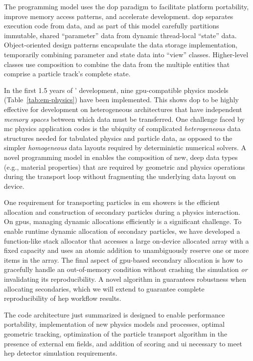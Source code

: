 The \celeritas programming model uses the \ac{dop} paradigm \cite{dop_2022} to
facilitate platform portability, improve memory access patterns, and accelerate
development. \ac{dop} separates execution code from data, and as part of this
model \celeritas carefully partitions immutable, shared ``parameter'' data from
dynamic thread-local ``state'' data. Object-oriented design patterns encapsulate
the data storage implementation, temporarily combining parameter and state data
into ``view'' classes.  Higher-level classes use composition to combine the data
from the multiple entities that comprise a particle track's complete state.

In the first 1.5 years of \celeritas' development, nine \ac{gpu}-compatible
physics models (Table~\ref{tab:em-physics}) have been implemented. This shows
\ac{dop} to be highly effective for development on heterogeneous architectures
that have independent \emph{memory spaces} between which data must be
transferred. One challenge faced by \ac{mc} physics application codes is the
ubiquity of complicated \emph{heterogeneous} data structures needed for
tabulated physics and particle data, as opposed to the simpler
\emph{homogeneous} data layouts required by deterministic numerical solvers. A
novel programming model in \celeritas enables the composition of new, deep data
types (e.g., material properties) that are required by geometric and physics
operations during the transport loop without fragmenting the underlying data
layout on device.

One requirement for transporting particles in \ac{em} showers is the efficient
allocation and construction of secondary particles during a physics interaction.
On \acp{gpu}, managing dynamic allocations efficiently is a significant
challenge.  To enable runtime dynamic allocation of secondary particles, we have
developed a function-like stack allocator that accesses a large on-device
allocated array with a fixed capacity and uses an atomic addition to
unambiguously reserve one or more items in the array. The final aspect of
\ac{gpu}-based secondary allocation is how to gracefully handle an out-of-memory
condition without crashing the simulation \emph{or} invalidating its
reproducibility. A novel algorithm in \celeritas guarantees robustness when
allocating secondaries, which we will extend to guarantee complete
reproducibility of \ac{hep} workflow results.

The \celeritas code architecture just summarized is designed to enable 
performance portability,  implementation of new physics models and
processes,  optimal geometric tracking,  optimization of the
particle transport algorithm in the presence of external \ac{em} fields, and
 addition of scoring and \ac{ui} necessary to meet \acs{hep} detector
simulation requirements.

